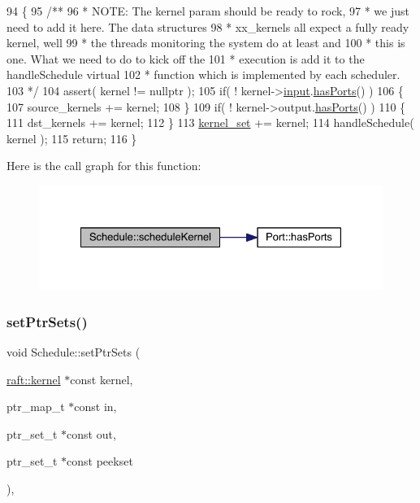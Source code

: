 \begin{DoxyCode}
94 \{\textcolor{comment}{}
95 \textcolor{comment}{   /**}
96 \textcolor{comment}{    * NOTE: The kernel param should be ready to rock,}
97 \textcolor{comment}{    * we just need to add it here.  The data structures}
98 \textcolor{comment}{    * xx\_kernels all expect a fully ready kernel, well}
99 \textcolor{comment}{    * the threads monitoring the system do at least and}
100 \textcolor{comment}{    * this is one.  What we need to do to kick off the}
101 \textcolor{comment}{    * execution is add it to the handleSchedule virtual}
102 \textcolor{comment}{    * function which is implemented by each scheduler.}
103 \textcolor{comment}{    */}
104    assert( kernel != \textcolor{keyword}{nullptr} );
105    \textcolor{keywordflow}{if}( ! kernel->\hyperlink{classraft_1_1kernel_a6edbe35a56409d402e719b3ac36d6554}{input}.\hyperlink{class_port_a7042f5b5c2ab14c9591a4984811a6012}{hasPorts}() )
106    \{
107       source\_kernels +=  kernel;
108    \}
109    \textcolor{keywordflow}{if}( ! kernel->output.\hyperlink{class_port_a7042f5b5c2ab14c9591a4984811a6012}{hasPorts}() )
110    \{
111       dst\_kernels += kernel;
112    \}
113    \hyperlink{class_schedule_a1a448b0d48e656f94db65a70cedd8eed}{kernel\_set} += kernel;
114    handleSchedule( kernel );
115    \textcolor{keywordflow}{return};
116 \}
\end{DoxyCode}
Here is the call graph for this function\+:
\nopagebreak
\begin{figure}[H]
\begin{center}
\leavevmode
\includegraphics[width=328pt]{class_schedule_a6a722f6e76c8b8dc67874d9974b6d641_cgraph}
\end{center}
\end{figure}
\hypertarget{class_schedule_aefaf185cc7d1f424cef7b23d8f679d47}{}\label{class_schedule_aefaf185cc7d1f424cef7b23d8f679d47} 
\subsubsection{\texorpdfstring{set\+Ptr\+Sets()}{setPtrSets()}}
{\footnotesize\ttfamily void Schedule\+::set\+Ptr\+Sets (\begin{DoxyParamCaption}\item[{\hyperlink{classraft_1_1kernel}{raft\+::kernel} $\ast$const}]{kernel,  }\item[{ptr\+\_\+map\+\_\+t $\ast$const}]{in,  }\item[{ptr\+\_\+set\+\_\+t $\ast$const}]{out,  }\item[{ptr\+\_\+set\+\_\+t $\ast$const}]{peekset }\end{DoxyParamCaption})\hspace{0.3cm}{\ttfamily [static]}, {\ttfamily [protected]}}

